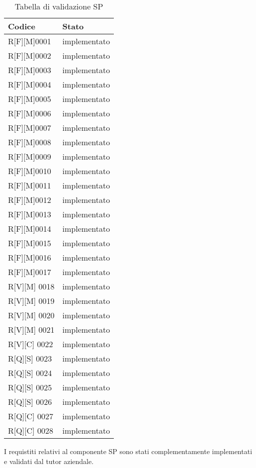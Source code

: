 \begin{center}
    \begin{longtable}{|p{3cm}|p{3cm}|}%
    \caption{Tabella di validazione SP}
    \label{tab:validazione-sp}
    \endfirsthead
    \endhead
    \hline
    \textbf{Codice}  & \textbf{Stato}\\
    \hline
    R[F][M]0001    & implementato  \\
    \hline
    R[F][M]0002    & implementato  \\
    \hline
    R[F][M]0003    & implementato  \\
    \hline
    R[F][M]0004    & implementato  \\
    \hline
    R[F][M]0005    & implementato  \\
    \hline
    R[F][M]0006    & implementato  \\
    \hline
    R[F][M]0007    & implementato  \\
    \hline
    R[F][M]0008    & implementato  \\
    \hline
    R[F][M]0009    & implementato  \\
    \hline
    R[F][M]0010    & implementato  \\
    \hline
    R[F][M]0011    & implementato  \\
    \hline
    R[F][M]0012    & implementato  \\
    \hline
    R[F][M]0013    & implementato  \\
    \hline
    R[F][M]0014    & implementato  \\
    \hline
    R[F][M]0015    & implementato  \\
    \hline
    R[F][M]0016    & implementato  \\
    \hline
    R[F][M]0017    & implementato  \\
    \hline
    R[V][M] 0018    & implementato  \\
    \hline
    R[V][M] 0019    & implementato  \\
    \hline
    R[V][M] 0020    & implementato  \\
    \hline
    R[V][M] 0021    & implementato  \\
    \hline
    R[V][C] 0022    & implementato  \\
    \hline
    R[Q][S] 0023    & implementato  \\
    \hline
    R[Q][S] 0024    & implementato  \\
    \hline
    R[Q][S] 0025    & implementato  \\
    \hline
    R[Q][S] 0026    & implementato  \\
    \hline
    R[Q][C] 0027    & implementato  \\
    \hline
    R[Q][C] 0028    & implementato  \\
    \hline
    \end{longtable}
    \end{center}%

I requistiti relativi al componente SP sono stati complementamente implementati e validati dal tutor aziendale.